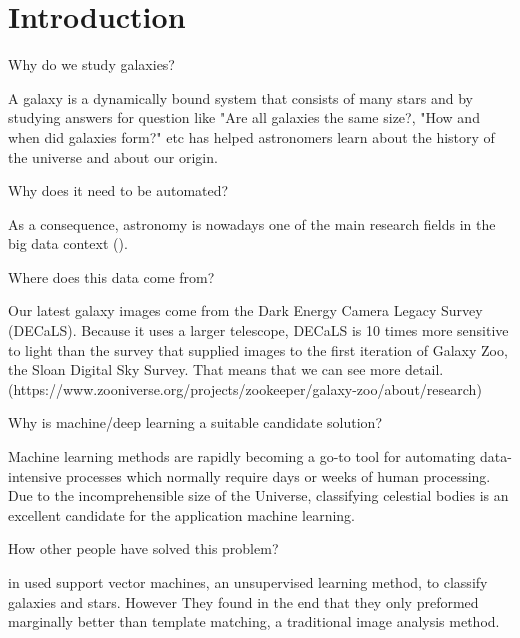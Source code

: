 \section{Introduction}

Why do we study galaxies?

A galaxy is a dynamically bound system that consists of many stars and by studying answers for question like "Are all galaxies the same size?, "How and when did galaxies form?" etc has helped astronomers learn about the history of the universe and about our origin.

Why does it need to be automated?

As a consequence, astronomy is nowadays one of the main research fields in the big data context (\citeauthor{microsoft-galaxies}).

Where does this data come from?

Our latest galaxy images come from the Dark Energy Camera Legacy Survey (DECaLS). Because it uses a larger telescope, DECaLS is 10 times more sensitive to light than the survey that supplied images to the first iteration of Galaxy Zoo, the Sloan Digital Sky Survey. That means that we can see more detail. (https://www.zooniverse.org/projects/zookeeper/galaxy-zoo/about/research)

Why is machine/deep learning a suitable candidate solution?

Machine learning methods are rapidly becoming a go-to tool for automating data-intensive processes which normally require days or weeks of human processing. Due to the incomprehensible size of the Universe, classifying celestial bodies is an excellent candidate for the application machine learning.


How other people have solved this problem?

\citeauthor{svn-galaxy} in \citeyear{svn-galaxy} used support vector machines, an unsupervised learning method, to classify galaxies and stars. However They found in the end that they only preformed marginally better than template matching, a traditional image analysis method.

